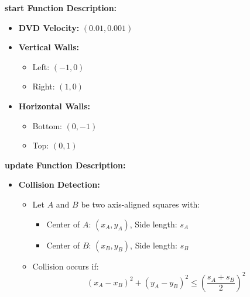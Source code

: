 \begin{minipage}[t]{0.5\linewidth}
    \textbf{start Function Description:}
    \begin{itemize}
        \item \textbf{DVD Velocity:} $(0.01, 0.001)$
        \item \textbf{Vertical Walls:}
        \begin{itemize}
            \item Left: $(-1, 0)$
            \item Right: $(1, 0)$
        \end{itemize}
        \item \textbf{Horizontal Walls:}
        \begin{itemize}
            \item Bottom: $(0, -1)$
            \item Top: $(0, 1)$
        \end{itemize}
    \end{itemize}
\end{minipage}%
\begin{minipage}[t]{0.5\linewidth}
    \textbf{update Function Description:}
    \begin{itemize}
        \item \textbf{Collision Detection:}
        \begin{itemize}
            \item Let $A$ and $B$ be two axis-aligned squares with:
            \begin{itemize}
                \item Center of $A$: $(x_A, y_A)$, Side length: $s_A$
                \item Center of $B$: $(x_B, y_B)$, Side length: $s_B$
            \end{itemize}
            \item Collision occurs if:
            \[
            (x_A - x_B)^2 + (y_A - y_B)^2 \leq \left(\frac{s_A + s_B}{2}\right)^2
            \]
        \end{itemize}
    \end{itemize}
\end{minipage}



